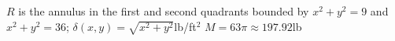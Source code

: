 {$R$ is the annulus in the first and second quadrants  bounded by $x^2+y^2=9$ and $x^2+y^2=36$; $\delta(x,y) = \sqrt{x^2+y^2}$lb/ft$^2$\label{13_04_ex_18}
}
{$M = 63\pi\approx 197.92$lb%
}
